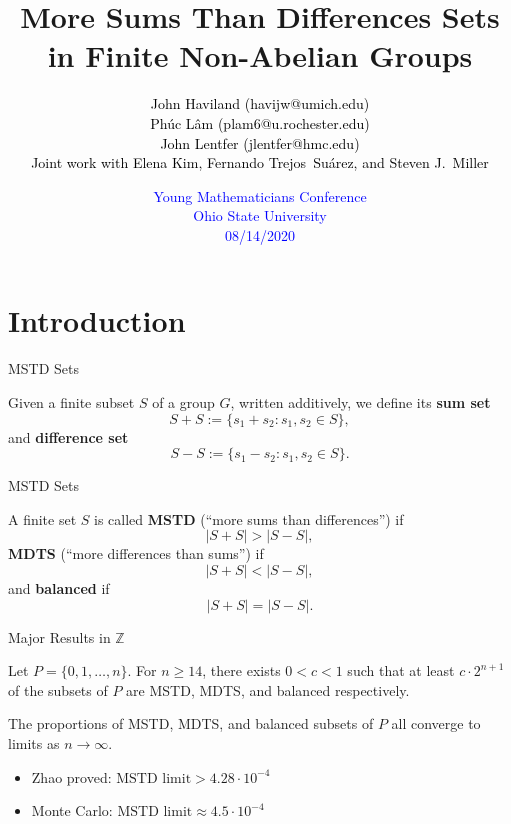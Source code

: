 \documentclass{beamer}
\title[MSTD]
{
  More Sums Than Differences Sets in Finite Non-Abelian Groups
}
\author[Steven J Miller] %
{\textcolor{black}{%
	John Haviland (havijw@umich.edu)\\%
	Ph\'uc L\^am (plam6@u.rochester.edu)\\%
	John Lentfer (jlentfer@hmc.edu)\\%
	Joint work with Elena Kim, Fernando Trejos\ Su\'arez, and Steven J.\ Miller%
}}
\date[2020]
{\small\textcolor{blue}{
	Young Mathematicians Conference\\%
	Ohio State University\\%
	08/14/2020}%
}
\newcommand{\bi}{\begin{itemize}}
\newcommand{\ei}{\end{itemize}}
\newcommand{\Z}{\mathbb{Z}}
\begin{document}
\begin{frame}
  \titlepage
\end{frame}

\large


\section{Introduction}

\begin{frame}{MSTD Sets}
\begin{definition}
	Given a finite subset $S$ of a group $G$, written additively, we define its \textbf{sum set}
	\[
	S + S := \{s_1 + s_2: s_1, s_2 \in S\},
	\]
	\pause
	and \textbf{difference set}
	\[
	S - S := \{s_1 - s_2: s_1, s_2 \in S\}.
	\]
\end{definition}
\end{frame}

\begin{frame}{MSTD Sets}
\begin{definition}
	A finite set $S$ is called \textbf{MSTD} (``more sums than differences'') if
	\[
	|S+S| > |S-S|,
	\]
	\pause
	\textbf{MDTS} (``more differences than sums'') if
	\[
	|S+S| < |S-S|,
	\]
	\pause
	and \textbf{balanced} if
	\[
	|S+S| = |S-S|.
	\]
\end{definition}
\end{frame}

\begin{frame}{Major Results in $\Z$}
\begin{theorem}
	Let $P = \{0, 1, \dots, n\}$. For $n \ge 14$, there exists $0 < c < 1$ such that at least $c\cdot 2^{n+1}$ of the subsets of $P$ are MSTD, MDTS, and balanced respectively.
\end{theorem}
\pause
\bigskip

\begin{theorem}[Zhao]
	The proportions of MSTD, MDTS, and balanced subsets of $P$ all converge to limits as $n \to \infty$.
\end{theorem}
\pause
\bi
	\item Zhao proved: $\text{MSTD limit} > 4.28 \cdot 10^{-4}$
		\pause
	\item Monte Carlo: $\text{MSTD limit} \approx 4.5 \cdot 10^{-4}$
\ei
\end{frame}
\end{document}
